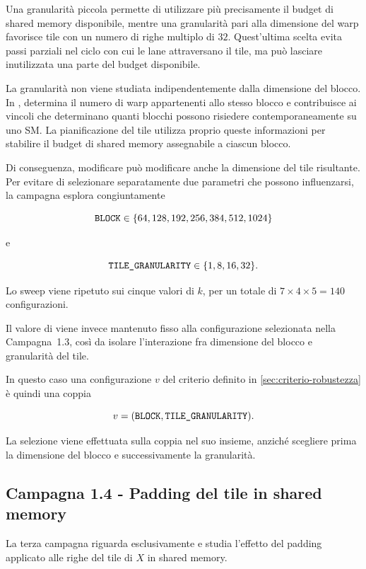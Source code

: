 Una granularità piccola permette di utilizzare più precisamente il budget
di shared memory disponibile, mentre una granularità pari alla dimensione
del warp favorisce tile con un numero di righe multiplo di $32$.
Quest'ultima scelta evita passi parziali nel ciclo con cui le lane
attraversano il tile, ma può lasciare inutilizzata una parte del budget
disponibile.

La granularità non viene studiata indipendentemente dalla dimensione del
blocco. In ,  determina il numero
di warp appartenenti allo stesso blocco e contribuisce ai vincoli che
determinano quanti blocchi possono risiedere contemporaneamente su uno SM.
La pianificazione del tile utilizza proprio queste informazioni per
stabilire il budget di shared memory assegnabile a ciascun blocco.

Di conseguenza, modificare  può modificare anche la dimensione
del tile risultante. Per evitare di selezionare separatamente due parametri
che possono influenzarsi, la campagna esplora congiuntamente

\[
\texttt{BLOCK}
\in
\{64,128,192,256,384,512,1024\}
\]

e

\[
\texttt{TILE\_GRANULARITY}
\in
\{1,8,16,32\}.
\]

Lo sweep viene ripetuto sui cinque valori di $k$, per un totale di
$7 \times 4 \times 5 = 140$ configurazioni.

Il valore di  viene invece mantenuto fisso alla
configurazione selezionata nella Campagna~1.3, così da isolare
l'interazione fra dimensione del blocco e granularità del tile.

In questo caso una configurazione $v$ del criterio definito in
\cref{sec:criterio-robustezza} è quindi una coppia

\[
v =
(\texttt{BLOCK},\texttt{TILE\_GRANULARITY}).
\]

La selezione viene effettuata sulla coppia nel suo insieme, anziché
scegliere prima la dimensione del blocco e successivamente la granularità.

\subsection{Campagna 1.4 - Padding del tile in shared memory}
\label{sec:camp-pad}

La terza campagna riguarda esclusivamente
 e studia l'effetto del padding applicato
alle righe del tile di $X$ in shared memory.

